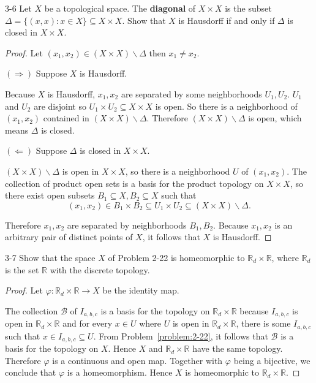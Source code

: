 \begin{problem}{3-6}
Let $X$ be a topological space. The \textbf{diagonal} of $X\times X$ is the subset $\Delta = \{ (x, x): x\in X \}\subseteq X\times X$. Show that $X$ is Hausdorff if and only if $\Delta$ is closed in $X\times X$.
\end{problem}

\begin{proof}
	Let $(x_{1}, x_{2})\in (X\times X)\smallsetminus\Delta$ then $x_{1}\ne x_{2}$.

	$(\Rightarrow)$ Suppose $X$ is Hausdorff.

	Because $X$ is Hausdorff, $x_{1}, x_{2}$ are separated by some neighborhoods $U_{1}, U_{2}$. $U_{1}$ and $U_{2}$ are disjoint so $U_{1}\times U_{2}\subseteq X\times X$ is open. So there is a neighborhood of $(x_{1}, x_{2})$ contained in $(X\times X)\smallsetminus\Delta$. Therefore $(X\times X)\smallsetminus\Delta$ is open, which means $\Delta$ is closed.

	$(\Leftarrow)$ Suppose $\Delta$ is closed in $X\times X$.

	$(X\times X)\smallsetminus\Delta$ is open in $X\times X$, so there is a neighborhood $U$ of $(x_{1}, x_{2})$. The collection of product open sets is a basis for the product topology on $X\times X$, so there exist open subsets $B_{1}\subseteq X, B_{2}\subseteq X$ such that
	\[
		(x_{1}, x_{2})\in B_{1}\times B_{2}\subseteq U_{1}\times U_{2}\subseteq (X\times X)\smallsetminus\Delta.
	\]

	Therefore $x_{1}, x_{2}$ are separated by neighborhoods $B_{1}, B_{2}$. Because $x_{1}, x_{2}$ is an arbitrary pair of distinct points of $X$, it follows that $X$ is Hausdorff.
\end{proof}

\begin{problem}{3-7}
Show that the space $X$ of Problem 2-22 is homeomorphic to $\mathbb{R}_{d}\times\mathbb{R}$, where $\mathbb{R}_{d}$ is the set $\mathbb{R}$ with the discrete topology.
\end{problem}

\begin{proof}
	Let $\varphi: \mathbb{R}_{d}\times\mathbb{R}\to X$ be the identity map.

	The collection $\mathscr{B}$ of $I_{a,b,c}$ is a basis for the topology on $\mathbb{R}_{d}\times\mathbb{R}$ because $I_{a,b,c}$ is open in $\mathbb{R}_{d}\times\mathbb{R}$ and for every $x\in U$ where $U$ is open in $\mathbb{R}_{d}\times\mathbb{R}$, there is some $I_{a,b,c}$ such that $x\in I_{a,b,c} \subseteq U$. From Problem~\ref{problem:2-22}, it follows that $\mathscr{B}$ is a basis for the topology on $X$. Hence $X$ and $\mathbb{R}_{d}\times\mathbb{R}$ have the same topology. Therefore $\varphi$ is a continuous and open map. Together with $\varphi$ being a bijective, we conclude that $\varphi$ is a homeomorphism. Hence $X$ is homeomorphic to $\mathbb{R}_{d}\times\mathbb{R}$.
\end{proof}

